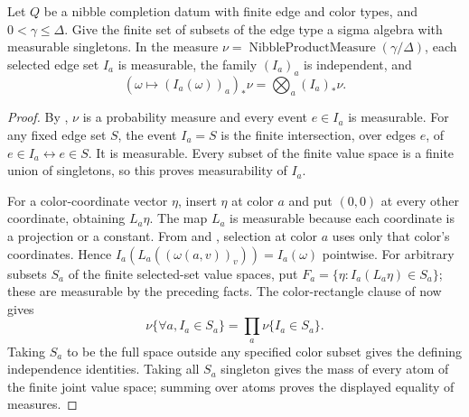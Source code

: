 \begin{lemma}
Let $Q$ be a nibble completion datum with finite edge and color types,
and $0<\gamma\le\Delta$. Give the finite set of subsets of the edge type
a sigma algebra with measurable singletons. In the measure
$\nu=\operatorname{NibbleProductMeasure}(\gamma/\Delta)$, each selected
edge set $I_a$ is measurable, the family $(I_a)_a$ is independent, and
\[
(\omega\mapsto(I_a(\omega))_a)_*\nu
=\bigotimes_a (I_a)_*\nu.
\]
\end{lemma}
\begin{proof}
By , $\nu$ is a probability measure
and every event $e\in I_a$ is measurable. For any fixed edge set $S$,
the event $I_a=S$ is the finite intersection, over edges $e$, of
$e\in I_a\leftrightarrow e\in S$. It is measurable. Every subset of
the finite value space is a finite union of singletons, so this proves
measurability of $I_a$.

For a color-coordinate vector $\eta$, insert $\eta$ at color $a$ and
put $(0,0)$ at every other coordinate, obtaining $L_a\eta$.
The map $L_a$ is measurable because each coordinate is a projection or
a constant. From  and
, selection at color $a$ uses only
that color's coordinates. Hence
$I_a(L_a((\omega(a,v))_v))=I_a(\omega)$ pointwise.
For arbitrary subsets $S_a$ of the finite selected-set value spaces,
put $F_a=\{\eta:I_a(L_a\eta)\in S_a\}$; these are measurable by the
preceding facts. The color-rectangle clause of
 now gives
\[
\nu\{\forall a,I_a\in S_a\}=\prod_a\nu\{I_a\in S_a\}.
\]
Taking $S_a$ to be the full space outside any specified color subset
gives the defining independence identities. Taking all $S_a$ singleton
gives the mass of every atom of the finite joint value space; summing
over atoms proves the displayed equality of measures.
\end{proof}
